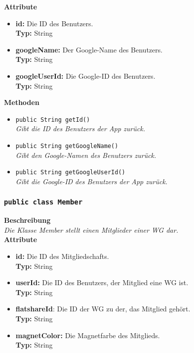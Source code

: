 	\textbf{Attribute}
	\begin{itemize}
		\item \textbf{id:} Die ID des Benutzers. \\
		\textbf{Typ:} String
		\item \textbf{googleName:} Der Google-Name des Benutzers. \\
		\textbf{Typ:} String
		\item \textbf{googleUserId:} Die Google-ID des Benutzers. \\
		\textbf{Typ:} String
	\end{itemize}

	\textbf{Methoden}
	\begin{itemize}
	\item{\texttt{public String getId()}}\\
	\textit{Gibt die ID des Benutzers der App zurück.}\\
	\item{\texttt{public String getGoogleName()}}\\
	\textit{Gibt den Google-Namen des Benutzers zurück.}\\
	
	\item{\texttt{public String getGoogleUserId()}}\\
	\textit{Gibt die Google-ID des Benutzers der App zurück.}\\
	\end{itemize}

	

\subsubsection{\texttt{public class Member}}

	\textbf{Beschreibung} \\
	\textit{Die Klasse Member stellt einen Mitglieder einer WG dar.} \\
	
	\textbf{Attribute}
	\begin{itemize}
		\item \textbf{id:} Die ID des Mitgliedschafts. \\
		\textbf{Typ:} String
		\item \textbf{userId:} Die ID des Benutzers, der Mitglied eine WG ist. \\
		\textbf{Typ:} String
		\item \textbf{flatshareId}: Die ID der WG zu der, das Mitglied gehört. \\
		\textbf{Typ:} String
		\item \textbf{magnetColor:} Die Magnetfarbe des Mitglieds. \\
		\textbf{Typ:} String
	\end{itemize}

